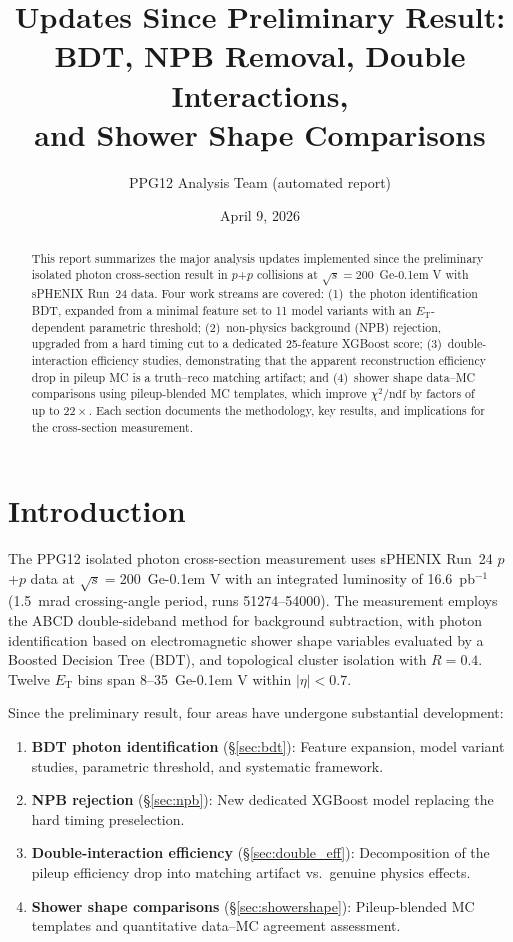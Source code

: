\documentclass[11pt,a4paper]{article}
\title{\LARGE\textbf{Updates Since Preliminary Result:\\
BDT, NPB Removal, Double Interactions,\\
and Shower Shape Comparisons}}
\author{PPG12 Analysis Team (automated report)}
\date{April 9, 2026}
\newcommand{\ET}{\ensuremath{E_{\text{T}}}\xspace}
\newcommand{\eT}{\ensuremath{E_{\text{T}}}\xspace}
\newcommand{\chidf}{\ensuremath{\chi^2/\mathrm{ndf}}\xspace}
\newcommand{\pp}{\mbox{$p$+$p$}\xspace}
\newcommand{\GeV}{\ifmmode {\mathrm{\ Ge\kern -0.1em V}}\else\textrm{Ge\kern -0.1em V}\fi\xspace}
\begin{document}
\maketitle

\begin{abstract}
This report summarizes the major analysis updates implemented since the
preliminary isolated photon cross-section result in \pp collisions at
$\sqrt{s} = 200$~\GeV with sPHENIX Run~24 data.
Four work streams are covered:
(1)~the photon identification BDT, expanded from a minimal feature set to
11 model variants with an $\ET$-dependent parametric threshold;
(2)~non-physics background (NPB) rejection, upgraded from a hard timing cut
to a dedicated 25-feature XGBoost score;
(3)~double-interaction efficiency studies, demonstrating that the apparent
reconstruction efficiency drop in pileup MC is a truth--reco matching artifact;
and (4)~shower shape data--MC comparisons using pileup-blended MC templates,
which improve \chidf by factors of up to $22\times$.
Each section documents the methodology, key results, and implications for the
cross-section measurement.
\end{abstract}

\tableofcontents
\clearpage

\section{Introduction}
\label{sec:intro}

The PPG12 isolated photon cross-section measurement uses sPHENIX Run~24 \pp
data at $\sqrt{s} = 200$~\GeV with an integrated luminosity of 16.6~pb$^{-1}$
(1.5~mrad crossing-angle period, runs 51274--54000).
The measurement employs the ABCD double-sideband method for background
subtraction, with photon identification based on electromagnetic shower shape
variables evaluated by a Boosted Decision Tree (BDT), and topological cluster
isolation with $R = 0.4$.
Twelve \eT bins span 8--35~\GeV within $|\eta| < 0.7$.

Since the preliminary result, four areas have undergone substantial development:
\begin{enumerate}
    \item \textbf{BDT photon identification} (\S\ref{sec:bdt}): Feature expansion,
      model variant studies, parametric threshold, and systematic framework.
    \item \textbf{NPB rejection} (\S\ref{sec:npb}): New dedicated XGBoost model
      replacing the hard timing preselection.
    \item \textbf{Double-interaction efficiency} (\S\ref{sec:double_eff}):
      Decomposition of the pileup efficiency drop into matching artifact vs.\
      genuine physics effects.
    \item \textbf{Shower shape comparisons} (\S\ref{sec:showershape}): Pileup-blended
      MC templates and quantitative data--MC agreement assessment.
\end{enumerate}
\end{document}
